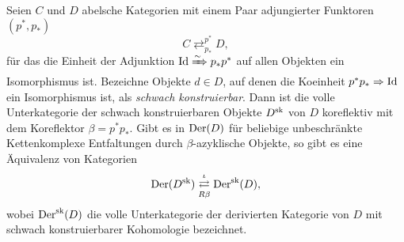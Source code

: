 \begin{satz} \label{gen-sk}
  Seien $C$ und $D$ abelsche Kategorien mit einem Paar adjungierter
  Funktoren $(p^*, p_*)$
  \[ C \mathrel{\mathop{\rightleftarrows}^{p^*}_{p_*}} D, \]
  für das die Einheit der Adjunktion $\operatorname{Id} \xRightarrow{\sim} p_* p^*$ auf allen
  Objekten ein Isomorphismus ist. Bezeichne Objekte $d \in D$, auf
  denen die Koeinheit $p^* p_* \Rightarrow \operatorname{Id}$ ein Isomorphismus ist, als
  \emph{schwach konstruierbar}. Dann ist die volle Unterkategorie der
  schwach konstruierbaren Objekte $D^{\operatorname{sk}}$ von $D$ koreflektiv mit
  dem Koreflektor $\beta = p^* p_*$. Gibt es in $\operatorname{Der}(D)$ für
  beliebige unbeschränkte Kettenkomplexe Entfaltungen durch
  $\beta$-azyklische Objekte, so gibt es eine Äquivalenz von
  Kategorien
  \[ \operatorname{Der}(D^{\operatorname{sk}})
  \mathrel{\mathop{\rightleftarrows}^{\iota}_{R \beta}}
  \operatorname{Der}^{\operatorname{sk}}(D),
  \]
  wobei $\operatorname{Der}^{\operatorname{sk}}(D)$ die volle Unterkategorie der derivierten
  Kategorie von $D$ mit schwach konstruierbarer Kohomologie
  bezeichnet.
\end{satz}
